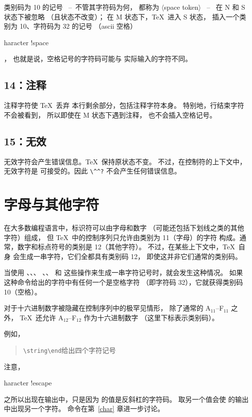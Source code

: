 \documentclass[a4paper]{rapport3}
\def\gr#1{$\langle$#1$\rangle$}\def\key#1{{\tt#1}}
\def\ldash{\unskip\ --\nobreak\ \ignorespaces}
\def\rdash{\unskip\nobreak\ --\ \ignorespaces}
\def\ascii{{\sc ascii}}
\newenvironment{disp}{\begin{quotation}}{\end{quotation}}
\def\term#1\par{\index{#1}}
\begin{document}
类别码为 10 的记号 \ldash 不管其字符码为何，
都称为 \gr{space token} \rdash
在 {\italic N} 和 {\italic S} 状态下被忽略
（且状态不改变）；
在 {\italic M} 状态下，\TeX\ 进入 {\italic S} 状态，
插入一个类别为 10、字符码为 32 的记号
（\ascii{} 空格）\term character !space\par，
也就是说，空格记号的字符码可能与
实际输入的字符不同。

\subsection{14：注释}

注释字符使 \TeX\ 丢弃
本行剩余部分，包括注释字符本身。
特别地，行结束字符不会被看到，
所以即使在 {\italic M} 状态下遇到注释，
也不会插入空格记号。

\subsection{15：无效}

无效字符会产生错误信息。\TeX\ 保持原状态不变。
不过，在控制符的上下文中，无效字符是
可接受的。因此 \verb>\^^?> 不会产生任何错误信息。
\awp

\section{字母与其他字符}
\label{cat12}

在大多数编程语言中，标识符可以由字母和数字
（可能还包括下划线之类的其他字符）组成，
但 \TeX\ 中的控制序列只允许由类别为 11（字母）的字符
构成。通常，数字和标点符号的类别是 12（其他字符）。
不过，在某些上下文中，\TeX\ 自身
会生成一串字符，它们全都具有类别码 12，
即使这并非它们通常的类别码。

当使用 、、、
、、 和 
这些操作来生成一串字符记号时，就会发生这种情况。
如果这种命令给出的字符中有任何一个是空格字符
（即字符码 32），它就获得类别码 10（空格）。

对于十六进制数字被隐藏在控制序列中的极罕见情形，
除了通常的 \n A$_{11}$--\n F$_{11}$ 之外，
\TeX\ 还允许 \n A$_{12}$--\n F$_{12}$ 作为十六进制数字
（这里下标表示类别码）。

例如，
\begin{disp}\verb>\string\end>\quad 给出四个字符记号\quad
{} \end{disp}
注意，
\term character !escape\par\label{use:escape}
之所以出现在输出中，只是因为
 的值是反斜杠的字符码。
 取另一个值会使  的输出
中出现另一个字符。 命令在第~\ref{char} 章进一步讨论。
\end{document}
